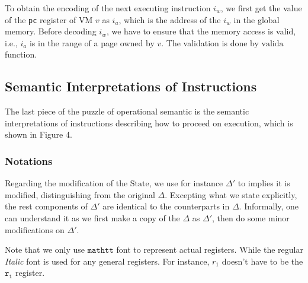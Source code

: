 \documentclass[a4paper]{article}
\newcommand*{\STATE}{\text{State}}
\newcommand*{\valida}{\text{valida}}
\begin{document}
To obtain the encoding of the next executing instruction $i_{w}$, we first get the
value of the \texttt{pc} register of VM $v$ as $i_{a}$, which is the address of the
$i_{w}$ in the global memory. Before decoding $i_{w}$, we have to ensure that the
memory access is valid, i.e., $i_{a}$ is in the range of a page owned by $v$.
The validation is done by $\valida$ function.


\subsection{Semantic Interpretations of Instructions}

The last piece of the puzzle of operational semantic
is the semantic interpretations of instructions describing how to proceed on
execution, which is shown in Figure 4.

\subsubsection{Notations}
Regarding the modification of the $\STATE$, we use for instance $\Delta'$ to
implies it is modified, distinguishing from the original $\Delta$. Excepting
what we state explicitly, the rest components of $\Delta'$ are identical to the
counterparts in $\Delta$. Informally, one can understand it as we first make a
copy of the $\Delta$ as $\Delta'$, then do some minor modifications on
$\Delta'$.

Note that we only use $\mathtt{mathtt}$ font to represent actual registers.
While the regular \emph{Italic} font is used for any general registers. For
instance, $r_{1}$ doesn't have to be the $\mathtt{r_{1}}$ register.
\end{document}
